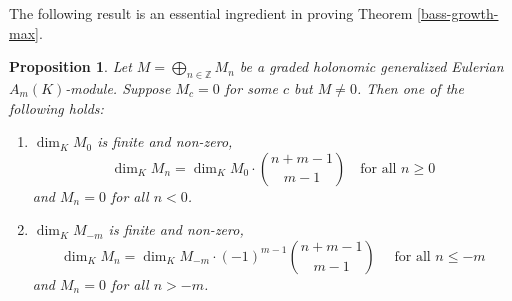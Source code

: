 \documentclass{amsart}
\newcommand{\ZZ}{\mathbb{Z} }
\theoremstyle{plain}
\newtheorem{proposition}[theorem]{Proposition}
\theoremstyle{definition}
\theoremstyle{remark}
\begin{document}
The following result is an essential ingredient in proving Theorem \ref{bass-growth-max}.
\begin{proposition} \label{msudan}
Let $M = \bigoplus_{n \in \ZZ}M_n$ be a graded holonomic generalized Eulerian $A_m(K)$-module. Suppose $M_c = 0$ for some $c$ but $M \neq 0$.
Then one of the following holds:
\begin{enumerate}[\rm(1)]
\item
$\dim_K M_0 $ is finite and non-zero, 
$$\dim_K M_n = \dim_K M_0 \cdot \binom{n + m -1}{m-1} \quad \text{for all $n \geq 0$}$$
 and $M_n = 0$ for all $n < 0$.
\item
$\dim_K M_{-m} $ is finite and non-zero, 
$$\dim_K M_n = \dim_K M_{-m} \cdot (-1)^{m-1}\binom{n + m -1}{m-1} \quad \text{ for all $n \leq -m$} $$ and $M_n = 0$ for all $n > -m$.
\end{enumerate}  
\end{proposition}
\end{document}
